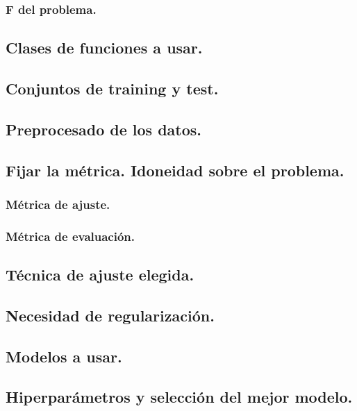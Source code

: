 \documentclass[12pt, spanish]{article}
\begin{document}
\subsubsection{F del problema.}

\subsection{Clases de funciones a usar.}

\subsection{Conjuntos de training y test.}

\subsection{Preprocesado de los datos.}

\subsection{Fijar la métrica. Idoneidad sobre el problema.}

\subsubsection{Métrica de ajuste.}

\subsubsection{Métrica de evaluación.}

\subsection{Técnica de ajuste elegida.}

\subsection{Necesidad de regularización.}

\subsection{Modelos a usar.}

\subsection{Hiperparámetros y selección del mejor modelo.}
\end{document}
